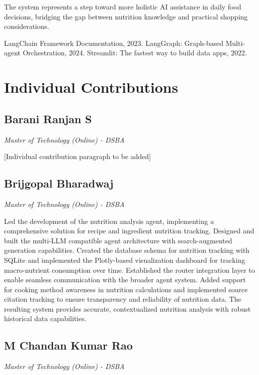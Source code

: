 \documentclass{ecai}
\begin{document}
The system represents a step toward more holistic AI assistance in daily food decisions, bridging the gap between nutrition knowledge and practical shopping considerations.


\begin{thebibliography}{9}
 LangChain Framework Documentation, 2023.
 LangGraph: Graph-based Multi-agent Orchestration, 2024.
 Streamlit: The fastest way to build data apps, 2022.
\end{thebibliography}

\clearpage
\section*{Individual Contributions}

\subsection*{Barani Ranjan S}
\textit{Master of Technology (Online) - DSBA}

[Individual contribution paragraph to be added]

\subsection*{Brijgopal Bharadwaj}
\textit{Master of Technology (Online) - DSBA}

Led the development of the nutrition analysis agent, implementing a comprehensive solution for recipe and ingredient nutrition tracking. Designed and built the multi-LLM compatible agent architecture with search-augmented generation capabilities. Created the database schema for nutrition tracking with SQLite and implemented the Plotly-based visualization dashboard for tracking macro-nutrient consumption over time. Established the router integration layer to enable seamless communication with the broader agent system. Added support for cooking method awareness in nutrition calculations and implemented source citation tracking to ensure transparency and reliability of nutrition data. The resulting system provides accurate, contextualized nutrition analysis with robust historical data capabilities.

\subsection*{M Chandan Kumar Rao}
\textit{Master of Technology (Online) - DSBA}
\end{document}
